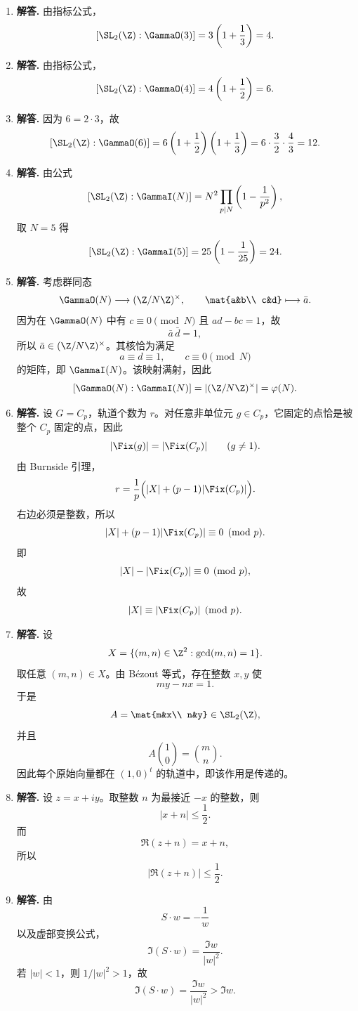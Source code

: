 \begin{enumerate}[label=\textbf{\arabic*.}, leftmargin=*, itemsep=1em]
\item \textbf{解答.} 由指标公式，
\[
[\SL_2(\Z):\GammaO(3)]
=3\left(1+\frac13\right)=4.
\]

\item \textbf{解答.} 由指标公式，
\[
[\SL_2(\Z):\GammaO(4)]
=4\left(1+\frac12\right)=6.
\]

\item \textbf{解答.} 因为 $6=2\cdot 3$，故
\[
[\SL_2(\Z):\GammaO(6)]
=6\left(1+\frac12\right)\left(1+\frac13\right)
=6\cdot \frac32\cdot \frac43=12.
\]

\item \textbf{解答.} 由公式
\[
[\SL_2(\Z):\GammaI(N)]
=N^2\prod_{p\mid N}\left(1-\frac1{p^2}\right),
\]
取 $N=5$ 得
\[
[\SL_2(\Z):\GammaI(5)]
=25\left(1-\frac1{25}\right)=24.
\]

\item \textbf{解答.} 考虑群同态
\[
\GammaO(N)\longrightarrow (\Z/N\Z)^\times,\qquad
\mat{a&b\\ c&d}\longmapsto \bar a.
\]
因为在 $\GammaO(N)$ 中有 $c\equiv 0\pmod N$ 且 $ad-bc=1$，故
\[
\bar a\,\bar d=1,
\]
所以 $\bar a\in(\Z/N\Z)^\times$。其核恰为满足
\[
a\equiv d\equiv 1,\qquad c\equiv 0\pmod N
\]
的矩阵，即 $\GammaI(N)$。该映射满射，因此
\[
[\GammaO(N):\GammaI(N)]
=|(\Z/N\Z)^\times|
=\varphi(N).
\]

\item \textbf{解答.} 设 $G=C_p$，轨道个数为 $r$。对任意非单位元 $g\in C_p$，它固定的点恰是被整个 $C_p$ 固定的点，因此
\[
|\Fix(g)|=|\Fix(C_p)|\qquad (g\neq 1).
\]
由 Burnside 引理，
\[
r=\frac1p\Bigl(|X|+(p-1)|\Fix(C_p)|\Bigr).
\]
右边必须是整数，所以
\[
|X|+(p-1)|\Fix(C_p)|\equiv 0\pmod p.
\]
即
\[
|X|-|\Fix(C_p)|\equiv 0\pmod p,
\]
故
\[
|X|\equiv |\Fix(C_p)|\pmod p.
\]

\item \textbf{解答.} 设
\[
X=\{(m,n)\in\Z^2:\gcd(m,n)=1\}.
\]
取任意 $(m,n)\in X$。由 Bézout 等式，存在整数 $x,y$ 使
\[
my-nx=1.
\]
于是
\[
A=\mat{m&x\\ n&y}\in \SL_2(\Z),
\]
并且
\[
A\binom10=\binom mn.
\]
因此每个原始向量都在 $(1,0)^t$ 的轨道中，即该作用是传递的。

\item \textbf{解答.} 设 $z=x+iy$。取整数 $n$ 为最接近 $-x$ 的整数，则
\[
|x+n|\le \frac12.
\]
而
\[
\Re(z+n)=x+n,
\]
所以
\[
|\Re(z+n)|\le \frac12.
\]

\item \textbf{解答.} 由
\[
S\cdot w=-\frac1w
\]
以及虚部变换公式，
\[
\Im(S\cdot w)=\frac{\Im w}{|w|^2}.
\]
若 $|w|<1$，则 $1/|w|^2>1$，故
\[
\Im(S\cdot w)=\frac{\Im w}{|w|^2}>\Im w.
\]


\end{enumerate}
